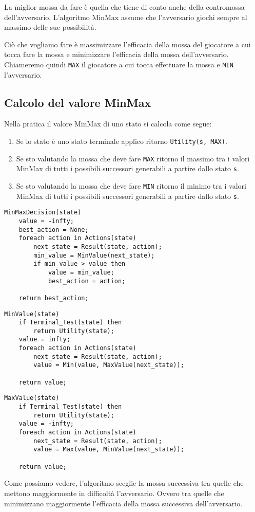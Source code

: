 La miglior mossa da fare \`e quella che tiene di conto anche della contromossa dell'avversario. L'algoritmo MinMax
assume che l'avversario giochi sempre al massimo delle sue possibilit\`a.

Ci\`o che vogliamo fare \`e massimizzare l'efficacia della mossa del giocatore a cui tocca fare la mossa e minimizzare
l'efficacia della mossa dell'avversario. Chiameremo quindi \verb|MAX| il giocatore a cui tocca effettuare la mossa
e \verb|MIN| l'avversario.

\subsection{Calcolo del valore MinMax}
Nella pratica il valore MinMax di uno stato si calcola come segue:
\begin{enumerate}
	\item Se lo stato \`e uno stato terminale applico ritorno \verb|Utility(s, MAX)|.
	\item Se sto valutando la mossa che deve fare \verb|MAX| ritorno il massimo tra i valori MinMax di tutti i possibili
	      successori generabili a partire dallo stato \verb|s|.
	\item Se sto valutando la mossa che deve fare \verb|MIN| ritorno il minimo tra i valori MinMax di tutti i possibili
	      successori generabili a partire dallo stato \verb|s|.
\end{enumerate}

\begin{lstlisting}[style=pseudo-style]
MinMaxDecision(state)
	value = -infty;
	best_action = None;
	foreach action in Actions(state)
		next_state = Result(state, action);
		min_value = MinValue(next_state);
		if min_value > value then
			value = min_value;
			best_action = action;

	return best_action;
\end{lstlisting}

\begin{lstlisting}[style=pseudo-style]
MinValue(state)
	if Terminal_Test(state) then
		return Utility(state);
	value = infty;
	foreach action in Actions(state)
		next_state = Result(state, action);
		value = Min(value, MaxValue(next_state));
	
	return value;
\end{lstlisting}

\begin{lstlisting}[style=pseudo-style]
MaxValue(state)
	if Terminal_Test(state) then
		return Utility(state);
	value = -infty;
	foreach action in Actions(state)
		next_state = Result(state, action);
		value = Max(value, MinValue(next_state));
	
	return value;
\end{lstlisting}
Come possiamo vedere, l'algoritmo sceglie la mossa successiva tra quelle che mettono maggiormente in difficolt\`a
l'avversario. Ovvero tra quelle che minimizzano maggiormente l'efficacia della mossa successiva dell'avversario.

